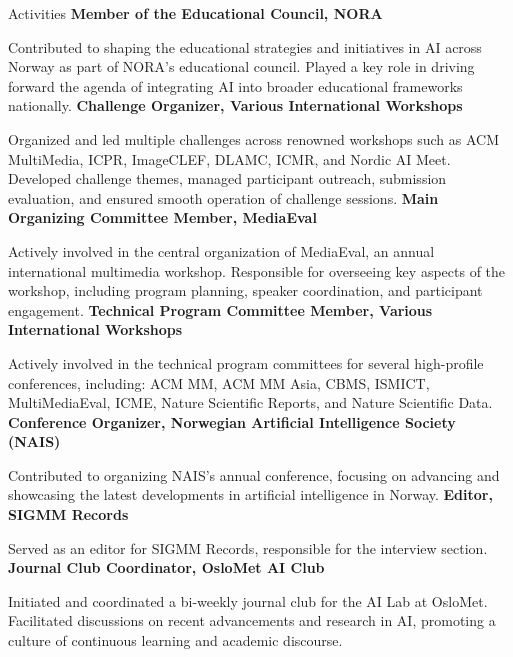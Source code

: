 \documentclass[a4paper,skipsamekey,10pt,english]{curve}
\begin{document}
\begin{rubric}{Activities}
\entry*[2023 -- present]%
\textbf{Member of the Educational Council, NORA} \par 
Contributed to shaping the educational strategies and initiatives in AI across Norway as part of NORA's educational council. Played a key role in driving forward the agenda of integrating AI into broader educational frameworks nationally.
% 
\entry*[2018 -- present]%
\textbf{Challenge Organizer, Various International Workshops} \par
Organized and led multiple challenges across renowned workshops such as ACM MultiMedia, ICPR, ImageCLEF, DLAMC, ICMR, and Nordic AI Meet. Developed challenge themes, managed participant outreach, submission evaluation, and ensured smooth operation of challenge sessions.
%
\entry*[2018 -- present]%
\textbf{Main Organizing Committee Member, MediaEval} \par
Actively involved in the central organization of MediaEval, an annual international multimedia workshop. Responsible for overseeing key aspects of the workshop, including program planning, speaker coordination, and participant engagement.
% 
\entry*[2018 -- present]%
\textbf{Technical Program Committee Member, Various International Workshops} \par
Actively involved in the technical program committees for several high-profile conferences, including: ACM MM, ACM MM Asia, CBMS, ISMICT, MultiMediaEval, ICME, Nature Scientific Reports, and Nature Scientific Data.
%
\entry*[2022]%
\textbf{Conference Organizer, Norwegian Artificial Intelligence Society (NAIS)} \par
Contributed to organizing NAIS's annual conference, focusing on advancing and showcasing the latest developments in artificial intelligence in Norway.
%
\entry*[2019 -- 2023]%
\textbf{Editor, SIGMM Records} \par
Served as an editor for SIGMM Records, responsible for the interview section.
%
\entry*[2019 -- 2020]%
\textbf{Journal Club Coordinator, OsloMet AI Club} \par
Initiated and coordinated a bi-weekly journal club for the AI Lab at OsloMet. Facilitated discussions on recent advancements and research in AI, promoting a culture of continuous learning and academic discourse.
\end{rubric}
\end{document}
